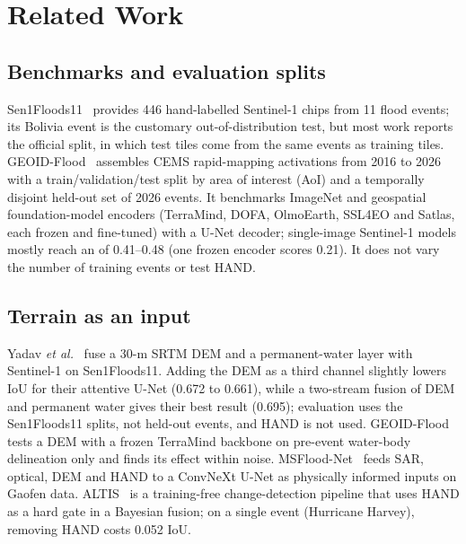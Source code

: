 \section{Related Work}

\subsection{Benchmarks and evaluation splits}
Sen1Floods11~\cite{bonafilia2020sen1floods11} provides 446 hand-labelled Sentinel-1 chips from 11 flood
events; its Bolivia event is the customary out-of-distribution test, but most work reports the official
split, in which test tiles come from the same events as training tiles. GEOID-Flood~\cite{geoidflood}
assembles CEMS rapid-mapping activations from 2016 to 2026 with a train/validation/test split by area of
interest (AoI) and a temporally disjoint held-out set of 2026 events. It benchmarks ImageNet and
geospatial foundation-model encoders (TerraMind, DOFA, OlmoEarth, SSL4EO and Satlas, each frozen and
fine-tuned) with a U-Net decoder; single-image Sentinel-1 models mostly reach an \iouf{} of 0.41--0.48 (one frozen encoder scores 0.21). It does
not vary the number of training events or test HAND.

\subsection{Terrain as an input}
Yadav \emph{et al.}~\cite{yadav2022attentive} fuse a 30-m SRTM DEM and a permanent-water layer with
Sentinel-1 on Sen1Floods11. Adding the DEM as a third channel slightly lowers IoU for their attentive
U-Net (0.672 to 0.661), while a two-stream fusion of DEM and permanent water gives their best result
(0.695); evaluation uses the Sen1Floods11 splits, not held-out events, and HAND is not used. GEOID-Flood
tests a DEM with a frozen TerraMind backbone on pre-event water-body delineation only and finds its effect
within noise. MSFlood-Net~\cite{msfloodnet} feeds SAR, optical, DEM and HAND to a ConvNeXt U-Net as
physically informed inputs on Gaofen data. ALTIS~\cite{altis} is a training-free change-detection
pipeline that uses HAND as a hard gate in a Bayesian fusion; on a single event (Hurricane Harvey),
removing HAND costs 0.052 IoU.

